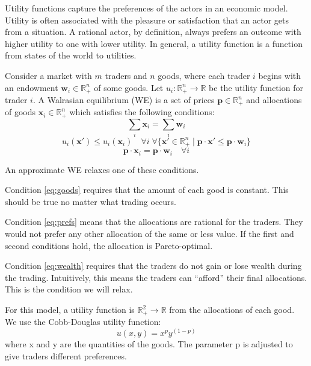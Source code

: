 \documentclass[12pt,a4paper,titlepage]{article}
\begin{document}
Utility functions capture the preferences of the actors in an economic model.
Utility is often associated with the pleasure or satisfaction that an actor gets from a situation.
A rational actor, by definition, always prefers an outcome with higher utility to one with lower utility. 
In general, a utility function is a function from states of the world to utilities.

Consider a market with $m$ traders and $n$ goods, where each trader $i$ begins with an endowment $\mathbf{w}_i \in \mathbb{R}^n_+ $ of some goods.
Let $u_i : \mathbb{R}^n_+ \rightarrow \mathbb{R}$ be the utility function for trader $i$.
A Walrasian equilibrium (WE) is a set of prices $\mathbf{p} \in \mathbb{R}^n_+$ and allocations of goods $\mathbf{x}_i \in \mathbb{R}^n_+$ which satisfies the following conditions:
\begin{equation}\label{eq:goods}
  \sum_i \mathbf{x}_i = \sum_i \mathbf{w}_i 
\end{equation}
\begin{equation}\label{eq:prefs}
  u_i(\mathbf{x'}) \leq u_i(\mathbf{x}_i) \quad
  \forall{i} \; \forall{\{\mathbf{x'} \in \mathbb{R}^n_+ \mid \mathbf{p} \cdot \mathbf{x'} \leq \mathbf{p} \cdot \mathbf{w}_i}\}
\end{equation}
\begin{equation}\label{eq:wealth}
  \mathbf{p} \cdot \mathbf{x}_i = \mathbf{p} \cdot \mathbf{w}_i \quad \forall{i} 
\end{equation}


An approximate WE relaxes one of these conditions.

Condition \ref{eq:goods} requires that the amount of each good is constant.
This should be true no matter what trading occurs.

Condition \ref{eq:prefs} means that the allocations are rational for the traders.
They would not prefer any other allocation of the same or less value.
If the first and second conditions hold, the allocation is Pareto-optimal.

Condition \ref{eq:wealth} requires that the traders do not gain or lose wealth during the trading.
Intuitively, this means the traders can ``afford'' their final allocations.
This is the condition we will relax.

For this model, a utility function is $\mathbb{R}^2_+ \rightarrow \mathbb{R}$ from the allocations of each good.
We use the Cobb-Douglas utility function:
\[
  u(x, y) = x^p y^{(1-p)}
\]
where x and y are the quantities of the goods.
The parameter p is adjusted to give traders different preferences.
\end{document}
